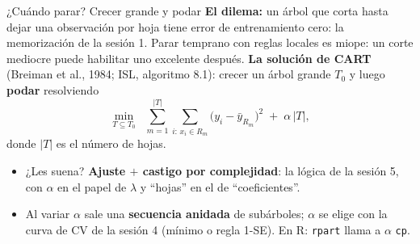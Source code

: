 \documentclass{beamer}
\newcommand{\1}{\mathbb{I}}
\begin{document}
\begin{frame}{¿Cuándo parar? Crecer grande y podar}
\small
\textbf{El dilema:} un árbol que corta hasta dejar una observación por hoja tiene error de entrenamiento cero: la memorización de la sesión 1. Parar temprano con reglas locales es miope: un corte mediocre puede habilitar uno excelente después.
\pause
\vspace{0.1cm}
\textbf{La solución de CART} (Breiman et al., 1984; ISL, algoritmo 8.1): crecer un árbol grande $T_0$ y luego \textbf{podar} resolviendo
\[ \min_{T \subseteq T_0} \;\; \sum_{m=1}^{|T|} \sum_{i:\, x_i \in R_m} \big( y_i - \bar{y}_{R_m} \big)^2 \;+\; \alpha\, |T|, \]
donde $|T|$ es el número de hojas.
\pause
\begin{itemize}\itemsep3pt
  \item ¿Les suena? \textbf{Ajuste $+$ castigo por complejidad}: la lógica de la sesión 5, con $\alpha$ en el papel de $\lambda$ y ``hojas'' en el de ``coeficientes''.
  \item Al variar $\alpha$ sale una \textbf{secuencia anidada} de subárboles; $\alpha$ se elige con la curva de CV de la sesión 4 (mínimo o regla 1-SE). En R: \texttt{rpart} llama a $\alpha$ \texttt{cp}.
\end{itemize}
\end{frame}
\end{document}

